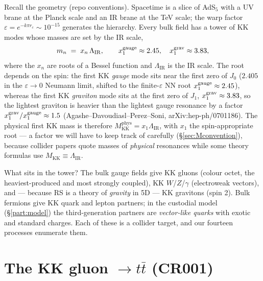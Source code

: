 \documentclass[11pt]{article}
\newcommand{\MKK}{M_{\mathrm{KK}}}
\newcommand{\LIR}{\Lambda_{\mathrm{IR}}}
\newcommand{\eps}{\varepsilon}
\theoremstyle{definition}
\begin{document}
Recall the geometry (repo conventions). Spacetime is a slice of AdS$_5$ with a
UV brane at the Planck scale and an IR brane at the TeV scale; the warp factor
$\eps = e^{-k\pi r_c}\sim 10^{-15}$ generates the hierarchy. Every bulk field
has a tower of KK modes whose masses are set by the IR scale,
\begin{equation}
m_n \;=\; x_n\,\LIR, \qquad
x_1^{\rm gauge} \approx 2.45, \quad
x_1^{\rm grav} \approx 3.83,
\label{eq:KKmass}
\end{equation}
where the $x_n$ are roots of a Bessel function and $\LIR$ is the IR scale. The
root depends on the spin: the first KK \emph{gauge} mode sits near the first zero
of $J_0$ ($2.405$ in the $\eps\to0$ Neumann limit, shifted to the finite-$\eps$
NN root $x_1^{\rm gauge}\approx 2.45$), whereas the first KK \emph{graviton}
mode sits at the first zero of $J_1$, $x_1^{\rm grav}\approx 3.83$, so the
lightest graviton is heavier than the lightest gauge resonance by a factor
$x_1^{\rm grav}/x_1^{\rm gauge}\approx 1.5$ (Agashe--Davoudiasl--Perez--Soni,
arXiv:hep-ph/0701186). The physical first KK mass is therefore
$\MKK^{\mathrm{phys}} = x_1\LIR$, with $x_1$ the spin-appropriate root --- a
factor we will have to keep track of carefully (\S\ref{sec:Mconvention}), because
collider papers quote masses of \emph{physical} resonances while some theory
formulas use $\MKK\equiv\LIR$.

What sits in the tower? The bulk gauge fields give KK gluons (colour octet, the
heaviest-produced and most strongly coupled), KK $W$/$Z$/$\gamma$ (electroweak
vectors), and --- because RS is a theory of \emph{gravity} in 5D --- KK
gravitons (spin 2). Bulk fermions give KK quark and lepton partners; in the
custodial model (\S\ref{part:model}) the third-generation partners are
\emph{vector-like quarks} with exotic and standard charges. Each of these is a
collider target, and our fourteen processes enumerate them.

\section{The KK gluon \texorpdfstring{$\to t\bar t$}{-> ttbar} (CR001)}
\label{sec:cr001}
\end{document}
